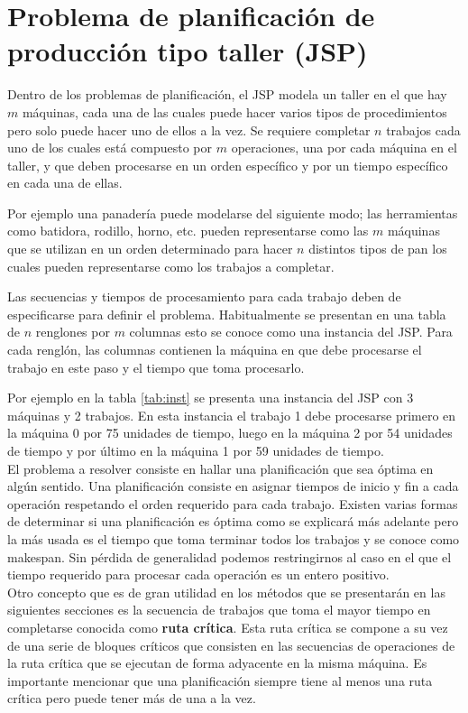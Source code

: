 \section{Problema de planificación de producción tipo taller (JSP)}

Dentro de los problemas de planificación, el JSP modela un taller en el que hay $m$ máquinas, cada una de las cuales puede hacer varios tipos de procedimientos pero solo puede hacer uno de ellos a la vez. Se requiere completar $n$ trabajos cada uno de los cuales está compuesto por $m$ operaciones, una por cada máquina en el taller, y que deben procesarse en un orden específico y por un tiempo específico en cada una de ellas. 

Por ejemplo una panadería puede modelarse del siguiente modo; las herramientas como batidora, rodillo, horno, etc. pueden representarse como las $m$ máquinas que se utilizan en un orden determinado para hacer $n$ distintos tipos de pan los cuales pueden representarse como los trabajos a completar.

Las secuencias y tiempos de procesamiento para cada trabajo deben de especificarse para definir el problema. Habitualmente se presentan en una tabla de $n$ renglones por $m$ columnas esto se conoce como una instancia del JSP. Para cada renglón, las columnas contienen la máquina en que debe procesarse el trabajo en este paso y el tiempo que toma procesarlo. 

Por ejemplo en la tabla \ref{tab:inst} se presenta una instancia del JSP con 3 máquinas y 2 trabajos. En esta instancia el trabajo 1 debe procesarse primero en la máquina 0 por 75 unidades de tiempo, luego en la máquina 2 por 54 unidades de tiempo y por último en la máquina 1 por 59 unidades de tiempo.\\

El problema a resolver consiste en hallar una planificación que sea óptima en algún sentido. Una planificación consiste en asignar tiempos de inicio y fin a cada operación respetando el orden requerido para cada trabajo. Existen varias formas de determinar si una planificación es óptima como se explicará más adelante pero la más usada es el tiempo que toma terminar todos los trabajos y se conoce como makespan. Sin pérdida de generalidad podemos restringirnos al caso en el que el tiempo requerido para procesar cada operación es un entero positivo.\\

Otro concepto que es de gran utilidad en los métodos que se presentarán en las siguientes secciones es la secuencia de trabajos que toma el mayor tiempo en completarse conocida como \textbf{ruta crítica}. Esta ruta crítica se compone a su vez de una serie de bloques críticos que consisten en las secuencias de operaciones de la ruta crítica que se ejecutan de forma adyacente en la misma máquina. Es importante mencionar que una planificación siempre tiene al menos una ruta crítica pero puede tener más de una a la vez.

